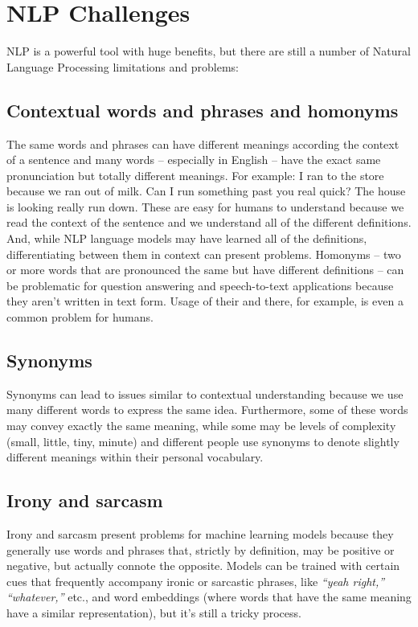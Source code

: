 \documentclass[11pt]{article}
\begin{document}
\clearpage

\section{NLP Challenges}
\label{sec:org00bcdc1}
NLP is a powerful tool with huge benefits, but there are still a number of Natural
Language Processing limitations and problems:
\subsection{Contextual words and phrases and homonyms}
\label{sec:orgfc7c0cd}
The same words and phrases can have different meanings according the context of a sentence and many words – especially in English – have the exact same pronunciation but totally different meanings.
For example:
I ran to the store because we ran out of milk.
Can I run something past you real quick?
The house is looking really run down.
These are easy for humans to understand because we read the context of the sentence and we understand all of the different definitions. And, while NLP language models may have learned all of the definitions, differentiating between them in context can present problems.
Homonyms – two or more words that are pronounced the same but have different definitions – can be problematic for question answering and speech-to-text applications because they aren’t written in text form. Usage of their and there, for example, is even a common problem for humans.  

\subsection{Synonyms}
\label{sec:orgdd202d8}
Synonyms can lead to issues similar to contextual understanding because we use
many different words to express the same idea. Furthermore, some of these words
may convey exactly the same meaning, while some may be levels of complexity
(small, little, tiny, minute) and different people use synonyms to denote slightly
different meanings within their personal vocabulary.
\subsection{Irony and sarcasm}
\label{sec:org21593f6}
Irony and sarcasm present problems for machine learning models because they generally
use words and phrases that, strictly by definition, may be positive or negative, but
actually connote the opposite.
Models can be trained with certain cues that frequently accompany ironic or sarcastic
phrases, like \emph{“yeah right,” “whatever,”} etc., and word embeddings (where words that
have the same meaning have a similar representation), but it’s still a tricky process.
\end{document}
